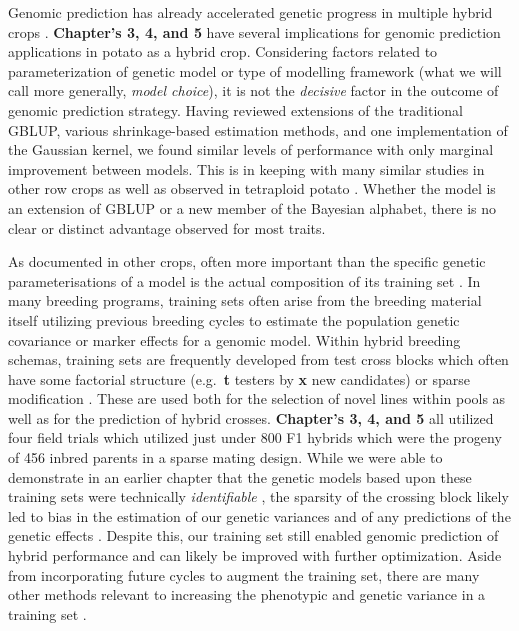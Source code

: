\documentclass[
]{article}
\begin{document}
Genomic prediction has already accelerated genetic progress in multiple
hybrid crops \autocite{Labroo2021}. \textbf{Chapter's 3, 4, and 5} have
several implications for genomic prediction applications in potato as a
hybrid crop. Considering factors related to parameterization of genetic
model or type of modelling framework (what we will call more generally,
\emph{model choice}), it is not the \emph{decisive} factor in the
outcome of genomic prediction strategy. Having reviewed extensions of
the traditional GBLUP, various shrinkage-based estimation methods, and
one implementation of the Gaussian kernel, we found similar levels of
performance with only marginal improvement between models. This is in
keeping with many similar studies in other row crops as well as observed
in tetraploid potato
\autocite{Sverrisdottir2017,Endelman2018,Amadeu2019,Wilson2021a,Schrauf2021}.
Whether the model is an extension of GBLUP or a new member of the
Bayesian alphabet, there is no clear or distinct advantage observed for
most traits.

As documented in other crops, often more important than the specific
genetic parameterisations of a model is the actual composition of its
training set \autocite{Dias2019}. In many breeding programs, training
sets often arise from the breeding material itself utilizing previous
breeding cycles to estimate the population genetic covariance or marker
effects for a genomic model. Within hybrid breeding schemas, training
sets are frequently developed from test cross blocks which often have
some factorial structure (e.g.~\textbf{t} testers by \textbf{x} new
candidates) or sparse modification \autocite{Jarquin2020}. These are
used both for the selection of novel lines within pools as well as for
the prediction of hybrid crosses. \textbf{Chapter's 3, 4, and 5} all
utilized four field trials which utilized just under 800 F1 hybrids
which were the progeny of 456 inbred parents in a sparse mating design.
While we were able to demonstrate in an earlier chapter that the genetic
models based upon these training sets were technically
\emph{identifiable} \autocite{Xenakis2019}, the sparsity of the crossing
block likely led to bias in the estimation of our genetic variances and
of any predictions of the genetic effects \autocite{Mohring2011}.
Despite this, our training set still enabled genomic prediction of
hybrid performance and can likely be improved with further optimization.
Aside from incorporating future cycles to augment the training set,
there are many other methods relevant to increasing the phenotypic and
genetic variance in a training set
\autocite{Isidro2015,Berro2019,Ou2019}.
\end{document}
